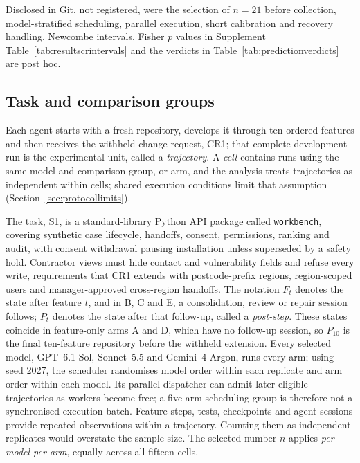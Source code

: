 Disclosed in Git, not registered, were the selection of $n=21$ before
collection, model-stratified scheduling, parallel execution, short calibration
and recovery handling.
Newcombe intervals, Fisher $p$ values in
Supplement Table~\ref{tab:resultscrintervals} and the verdicts in
Table~\ref{tab:predictionverdicts} are post hoc.

\subsection{Task and comparison groups}\label{sec:protocolsummary}

Each agent starts with a fresh repository, develops it through ten ordered features and then receives the withheld change request, CR1;
that complete development run is the experimental unit, called a
\emph{trajectory}. A \emph{cell} contains runs using the same model and
comparison group, or arm, and the analysis treats trajectories as independent
within cells; shared execution conditions limit that assumption
(Section~\ref{sec:protocollimits}).

The task, S1, is a standard-library Python API package called \texttt{workbench}, covering synthetic case lifecycle, handoffs, consent, permissions, ranking and audit, with consent withdrawal pausing installation unless superseded by a safety hold. Contractor views must hide contact and vulnerability fields and refuse every write, requirements that CR1 extends with postcode-prefix regions, region-scoped users and manager-approved cross-region handoffs.
The notation $F_t$ denotes the state after feature $t$, and in B, C and E,
a consolidation, review or repair session follows; $P_t$ denotes the
state after that follow-up, called a \emph{post-step}. These states
coincide in feature-only arms A and D, which have no follow-up session, so $P_{10}$ is the final ten-feature repository before the withheld extension.
Every selected model, GPT~6.1 Sol, Sonnet~5.5 and Gemini~4 Argon,
runs every arm; using seed 2027, the scheduler randomises model order within each replicate and arm order within each model. Its parallel dispatcher can admit later
eligible trajectories as workers become free; a five-arm scheduling group
is therefore not a synchronised execution batch. Feature steps, tests, checkpoints and agent sessions provide repeated
observations within a trajectory. Counting them as independent replicates would overstate the sample size.
The selected number $n$ applies
\emph{per model per arm}, equally across all fifteen cells.


